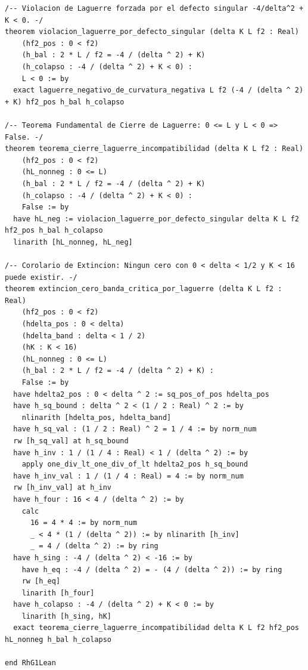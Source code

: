 \documentclass[11pt,a4paper]{article}
\theoremstyle{definition}
\theoremstyle{remark}
\begin{document}
\begin{lstlisting}[language=Lean4]
/-- Violacion de Laguerre forzada por el defecto singular -4/delta^2 + K < 0. -/
theorem violacion_laguerre_por_defecto_singular (delta K L f2 : Real)
    (hf2_pos : 0 < f2)
    (h_bal : 2 * L / f2 = -4 / (delta ^ 2) + K)
    (h_colapso : -4 / (delta ^ 2) + K < 0) :
    L < 0 := by
  exact laguerre_negativo_de_curvatura_negativa L f2 (-4 / (delta ^ 2) + K) hf2_pos h_bal h_colapso

/-- Teorema Fundamental de Cierre de Laguerre: 0 <= L y L < 0 => False. -/
theorem teorema_cierre_laguerre_incompatibilidad (delta K L f2 : Real)
    (hf2_pos : 0 < f2)
    (hL_nonneg : 0 <= L)
    (h_bal : 2 * L / f2 = -4 / (delta ^ 2) + K)
    (h_colapso : -4 / (delta ^ 2) + K < 0) :
    False := by
  have hL_neg := violacion_laguerre_por_defecto_singular delta K L f2 hf2_pos h_bal h_colapso
  linarith [hL_nonneg, hL_neg]

/-- Corolario de Extincion: Ningun cero con 0 < delta < 1/2 y K < 16 puede existir. -/
theorem extincion_cero_banda_critica_por_laguerre (delta K L f2 : Real)
    (hf2_pos : 0 < f2)
    (hdelta_pos : 0 < delta)
    (hdelta_band : delta < 1 / 2)
    (hK : K < 16)
    (hL_nonneg : 0 <= L)
    (h_bal : 2 * L / f2 = -4 / (delta ^ 2) + K) :
    False := by
  have hdelta2_pos : 0 < delta ^ 2 := sq_pos_of_pos hdelta_pos
  have h_sq_bound : delta ^ 2 < (1 / 2 : Real) ^ 2 := by
    nlinarith [hdelta_pos, hdelta_band]
  have h_sq_val : (1 / 2 : Real) ^ 2 = 1 / 4 := by norm_num
  rw [h_sq_val] at h_sq_bound
  have h_inv : 1 / (1 / 4 : Real) < 1 / (delta ^ 2) := by
    apply one_div_lt_one_div_of_lt hdelta2_pos h_sq_bound
  have h_inv_val : 1 / (1 / 4 : Real) = 4 := by norm_num
  rw [h_inv_val] at h_inv
  have h_four : 16 < 4 / (delta ^ 2) := by
    calc
      16 = 4 * 4 := by norm_num
      _ < 4 * (1 / (delta ^ 2)) := by nlinarith [h_inv]
      _ = 4 / (delta ^ 2) := by ring
  have h_sing : -4 / (delta ^ 2) < -16 := by
    have h_eq : -4 / (delta ^ 2) = - (4 / (delta ^ 2)) := by ring
    rw [h_eq]
    linarith [h_four]
  have h_colapso : -4 / (delta ^ 2) + K < 0 := by
    linarith [h_sing, hK]
  exact teorema_cierre_laguerre_incompatibilidad delta K L f2 hf2_pos hL_nonneg h_bal h_colapso

end RhG1Lean
\end{lstlisting}
\end{document}
